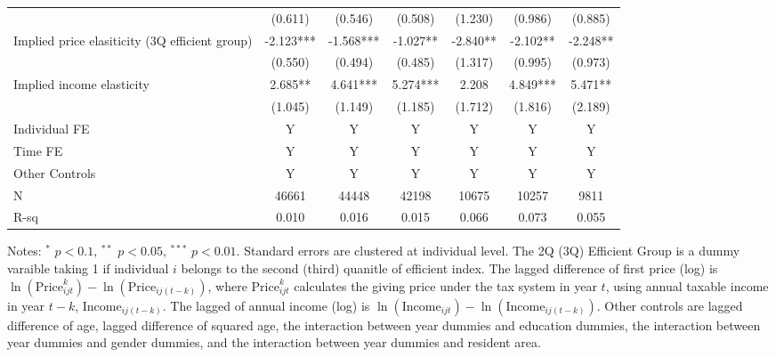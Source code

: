 \documentclass[ review  , 3p ]{elsarticle}
\begin{document}
\begin{table}
\begin{threeparttable}
\begin{tabular}[t]{lcccccc}
   & (0.611) & (0.546) & (0.508) & (1.230) & (0.986) & (0.885)\\
  Implied price elasiticity (3Q efficient group) & -2.123*** & -1.568*** & -1.027** & -2.840** & -2.102** & -2.248**\\
   & (0.550) & (0.494) & (0.485) & (1.317) & (0.995) & (0.973)\\
  Implied income elasticity & 2.685** & 4.641*** & 5.274*** & 2.208 & 4.849*** & 5.471**\\
   & (1.045) & (1.149) & (1.185) & (1.712) & (1.816) & (2.189)\\
  Individual FE & Y & Y & Y & Y & Y & Y\\
  Time FE & Y & Y & Y & Y & Y & Y\\
  Other Controls & Y & Y & Y & Y & Y & Y\\
  N & 46661 & 44448 & 42198 & 10675 & 10257 & 9811\\
  R-sq & 0.010 & 0.016 & 0.015 & 0.066 & 0.073 & 0.055\\
  \bottomrule
  \end{tabular}
  \begin{tablenotes}
  \item Notes: $^{*}$ $p < 0.1$, $^{**}$ $p < 0.05$, $^{***}$ $p < 0.01$. Standard errors are clustered at individual level. The 2Q (3Q) Efficient Group is a dummy varaible taking 1 if individual $i$ belongs to the second (third) quanitle of efficient index. The lagged difference of first price (log) is $\ln(\text{Price}^k_{ijt}) - \ln(\text{Price}_{ij(t-k)})$, where $\text{Price}^k_{ijt}$ calculates the giving price under the tax system in year $t$, using annual taxable income in year $t-k$, $\text{Income}_{ij(t-k)}$. The lagged of annual income (log) is $\ln(\text{Income}_{ijt}) - \ln(\text{Income}_{ij(t-k)})$. Other controls are lagged difference of age, lagged difference of squared age, the interaction between year dummies and education dummies, the interaction between year dummies and gender dummies, and the interaction between year dummies and resident area.
  \end{tablenotes}
  \end{threeparttable}
  \end{table}
  
\end{document}
